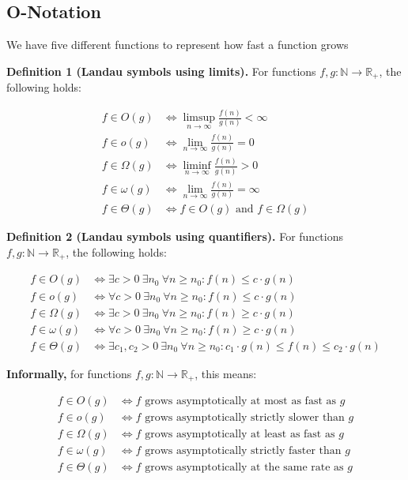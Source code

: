 

\subsection{O-Notation}
We have five different functions to represent how fast a function grows

\textbf{Definition 1 (Landau symbols using limits).} For functions $f, g : \mathbb{N} \to \mathbb{R}_{+}$, the following holds:

\[
\begin{aligned}
f \in O(g) &\iff \limsup_{n \to \infty} \frac{f(n)}{g(n)} < \infty \\
f \in o(g) &\iff \lim_{n \to \infty} \frac{f(n)}{g(n)} = 0 \\
f \in \Omega(g) &\iff \liminf_{n \to \infty} \frac{f(n)}{g(n)} > 0 \\
f \in \omega(g) &\iff \lim_{n \to \infty} \frac{f(n)}{g(n)} = \infty \\
f \in \Theta(g) &\iff f \in O(g) \text{ and } f \in \Omega(g)
\end{aligned}
\]

\textbf{Definition 2 (Landau symbols using quantifiers).} For functions $f, g : \mathbb{N} \to \mathbb{R}_{+}$, the following holds:

\[
\begin{aligned}
f \in O(g) &\iff \exists c > 0 \ \exists n_0 \ \forall n \ge n_0 : f(n) \le c \cdot g(n) \\
f \in o(g) &\iff \forall c > 0 \ \exists n_0 \ \forall n \ge n_0 : f(n) \le c \cdot g(n) \\
f \in \Omega(g) &\iff \exists c > 0 \ \exists n_0 \ \forall n \ge n_0 : f(n) \ge c \cdot g(n) \\
f \in \omega(g) &\iff \forall c > 0 \ \exists n_0 \ \forall n \ge n_0 : f(n) \ge c \cdot g(n) \\
f \in \Theta(g) &\iff \exists c_1, c_2 > 0 \ \exists n_0 \ \forall n \ge n_0 : c_1 \cdot g(n) \le f(n) \le c_2 \cdot g(n)
\end{aligned}
\]

\textbf{Informally,} for functions $f, g : \mathbb{N} \to \mathbb{R}_{+}$, this means:

\[
\begin{aligned}
f \in O(g) &\iff f \text{ grows asymptotically at most as fast as } g \\
f \in o(g) &\iff f \text{ grows asymptotically strictly slower than } g \\
f \in \Omega(g) &\iff f \text{ grows asymptotically at least as fast as } g \\
f \in \omega(g) &\iff f \text{ grows asymptotically strictly faster than } g \\
f \in \Theta(g) &\iff f \text{ grows asymptotically at the same rate as } g
\end{aligned}
\]


